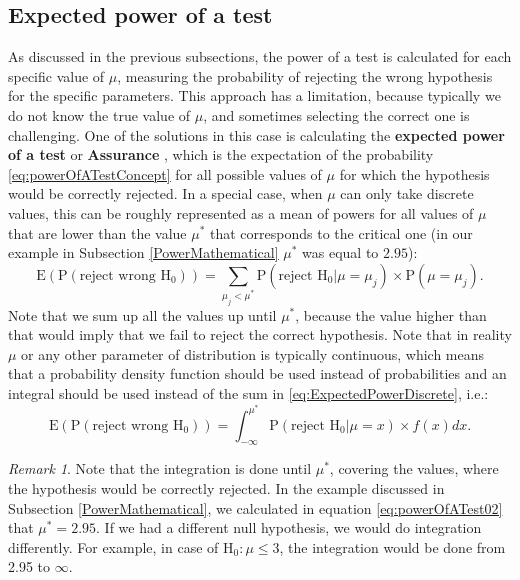 \documentclass[
]{book}
\theoremstyle{definition}
\theoremstyle{definition}
\theoremstyle{definition}
\theoremstyle{definition}
\theoremstyle{remark}
\newtheorem*{remark}{Remark}
\begin{document}
\subsection{Expected power of a test}\label{expected-power-of-a-test}

As discussed in the previous subsections, the power of a test is calculated for each specific value of \(\mu\), measuring the probability of rejecting the wrong hypothesis for the specific parameters. This approach has a limitation, because typically we do not know the true value of \(\mu\), and sometimes selecting the correct one is challenging. One of the solutions in this case is calculating the \textbf{expected power of a test} or \textbf{Assurance} \citep{OHagan2005}, which is the expectation of the probability \eqref{eq:powerOfATestConcept} for all possible values of \(\mu\) for which the hypothesis would be correctly rejected. In a special case, when \(\mu\) can only take discrete values, this can be roughly represented as a mean of powers for all values of \(\mu\) that are lower than the value \(\mu^*\) that corresponds to the critical one (in our example in Subsection \ref{PowerMathematical} \(\mu^*\) was equal to \(2.95\)):
\begin{equation}
    \mathrm{E}(\mathrm{P}(\text{reject wrong }\mathrm{H}_0)) = \sum_{\mu_j<\mu^*} \mathrm{P}(\text{reject }\mathrm{H}_0 | \mu=\mu_j) \times \mathrm{P}(\mu=\mu_j) .
    \label{eq:ExpectedPowerDiscrete}
\end{equation}
Note that we sum up all the values up until \(\mu^*\), because the value higher than that would imply that we fail to reject the correct hypothesis. Note that in reality \(\mu\) or any other parameter of distribution is typically continuous, which means that a probability density function should be used instead of probabilities and an integral should be used instead of the sum in \eqref{eq:ExpectedPowerDiscrete}, i.e.:
\begin{equation}
    \mathrm{E}(\mathrm{P}(\text{reject wrong }\mathrm{H}_0)) = \int_{-\infty}^{\mu^*} \mathrm{P}(\text{reject }\mathrm{H}_0 | \mu=x) \times f(x)dx .
    \label{eq:ExpectedPower}
\end{equation}

\begin{remark}
Note that the integration is done until \(\mu^*\), covering the values, where the hypothesis would be correctly rejected. In the example discussed in Subsection \ref{PowerMathematical}, we calculated in equation \eqref{eq:powerOfATest02} that \(\mu^*=2.95\). If we had a different null hypothesis, we would do integration differently. For example, in case of \(\mathrm{H}_0: \mu \leq 3\), the integration would be done from 2.95 to \(\infty\).
\end{remark}
\end{document}
